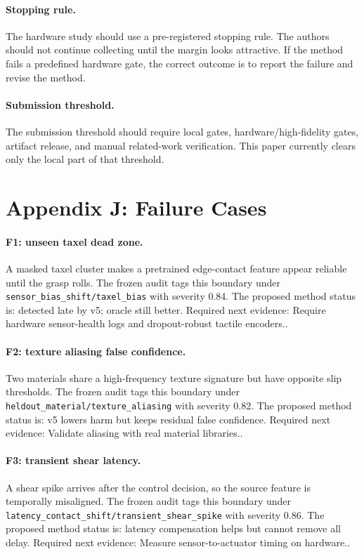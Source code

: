 \documentclass{article}
\begin{document}
\paragraph{Stopping rule.}
The hardware study should use a pre-registered stopping rule. The authors should not continue collecting until the margin looks attractive. If the method fails a predefined hardware gate, the correct outcome is to report the failure and revise the method.

\paragraph{Submission threshold.}
The submission threshold should require local gates, hardware/high-fidelity gates, artifact release, and manual related-work verification. This paper currently clears only the local part of that threshold.

\clearpage
\section{Appendix J: Failure Cases}
\paragraph{F1: unseen taxel dead zone.} A masked taxel cluster makes a pretrained edge-contact feature appear reliable until the grasp rolls. The frozen audit tags this boundary under \texttt{sensor\_bias\_shift/taxel\_bias} with severity 0.84. The proposed method status is: detected late by v5; oracle still better. Required next evidence: Require hardware sensor-health logs and dropout-robust tactile encoders..

\paragraph{F2: texture aliasing false confidence.} Two materials share a high-frequency texture signature but have opposite slip thresholds. The frozen audit tags this boundary under \texttt{heldout\_material/texture\_aliasing} with severity 0.82. The proposed method status is: v5 lowers harm but keeps residual false confidence. Required next evidence: Validate aliasing with real material libraries..

\paragraph{F3: transient shear latency.} A shear spike arrives after the control decision, so the source feature is temporally misaligned. The frozen audit tags this boundary under \texttt{latency\_contact\_shift/transient\_shear\_spike} with severity 0.86. The proposed method status is: latency compensation helps but cannot remove all delay. Required next evidence: Measure sensor-to-actuator timing on hardware..
\end{document}

